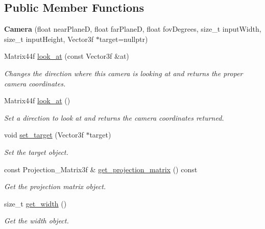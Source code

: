 \subsection*{Public Member Functions}
\begin{DoxyCompactItemize}
\item 
\mbox{\label{classprzurro_1_1_camera_a01698f245b2ce8accec92313c7a060f2}} 
{\bfseries Camera} (float near\+PlaneD, float far\+PlaneD, float fov\+Degrees, size\+\_\+t input\+Width, size\+\_\+t input\+Height, Vector3f $\ast$target=nullptr)
\item 
Matrix44f \mbox{\hyperlink{classprzurro_1_1_camera_aaec8e7f387d2e5f5d06d16a2e814eba4}{look\+\_\+at}} (const Vector3f \&at)
\begin{DoxyCompactList}\small\item\em Changes the direction where this camera is looking at and returns the proper camera coordinates. \end{DoxyCompactList}\item 
Matrix44f \mbox{\hyperlink{classprzurro_1_1_camera_adcddf45e2cd4d5cf6badf0a2a615e3dd}{look\+\_\+at}} ()
\begin{DoxyCompactList}\small\item\em Set a direction to look at and returns the camera coordinates returned. \end{DoxyCompactList}\item 
void \mbox{\hyperlink{classprzurro_1_1_camera_ae38799bb62452f5bcf4d9f0f123adeac}{set\+\_\+target}} (Vector3f $\ast$target)
\begin{DoxyCompactList}\small\item\em Set the target object. \end{DoxyCompactList}\item 
const Projection\+\_\+\+Matrix3f \& \mbox{\hyperlink{classprzurro_1_1_camera_a9de15db51e07c62b88de013a717add73}{get\+\_\+projection\+\_\+matrix}} () const
\begin{DoxyCompactList}\small\item\em Get the projection matrix object. \end{DoxyCompactList}\item 
size\+\_\+t \mbox{\hyperlink{classprzurro_1_1_camera_aeae692f10b2c622a3e61c366ca33b2d6}{get\+\_\+width}} ()
\begin{DoxyCompactList}\small\item\em Get the width object. \end{DoxyCompactList}\item 

\end{DoxyCompactItemize}
